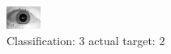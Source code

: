 \begin{figure}[h!]
\begin{center}
\includegraphics[width=0.60\columnwidth]{figures/ID1723_class_3_target_2.png}
\end{center}
\caption{ Classification: 3 actual target: 2}
\label{fig:ID1723_class_3_target_2}
\end{figure}
